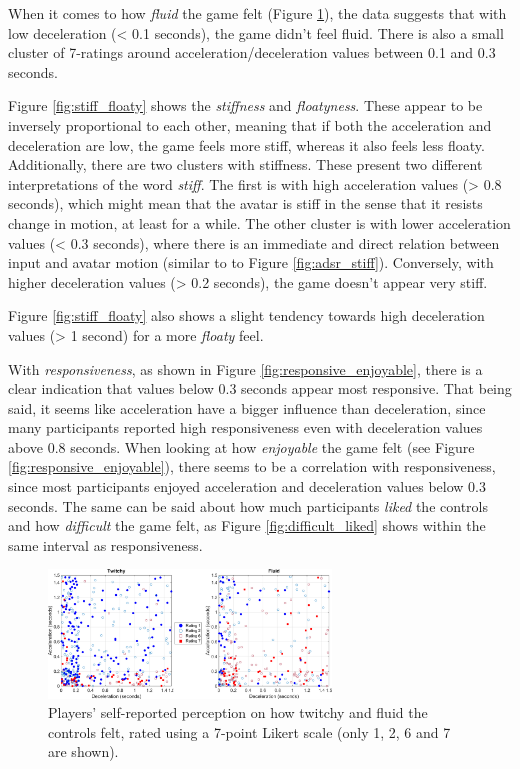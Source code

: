 When it comes to how \textit{fluid} the game felt (Figure \ref{fig:twitchyFluid}), the data suggests that with low deceleration (< 0.1 seconds), the game didn't feel fluid. There is also a small cluster of 7-ratings around acceleration/deceleration values between 0.1 and 0.3 seconds.

Figure \ref{fig:stiff_floaty} shows the \textit{stiffness} and \textit{floatyness}. These appear to be inversely proportional to each other, meaning that if both the acceleration and deceleration are low, the game feels more stiff, whereas it also feels less floaty. Additionally, there are two clusters with stiffness. These present two different interpretations of the word \textit{stiff}. The first is with high acceleration values (> 0.8 seconds), which might mean that the avatar is stiff in the sense that it resists change in motion, at least for a while. The other cluster is with lower acceleration values (< 0.3 seconds), where there is an immediate and direct relation between input and avatar motion (similar to to Figure \ref{fig:adsr_stiff}). Conversely, with higher deceleration values (> 0.2 seconds), the game doesn't appear very stiff.

Figure \ref{fig:stiff_floaty} also shows a slight tendency towards high deceleration values (> 1 second) for a more \textit{floaty} feel.

With \textit{responsiveness}, as shown in Figure \ref{fig:responsive_enjoyable}, there is a clear indication that values below 0.3 seconds appear most responsive. That being said, it seems like acceleration have a bigger influence than deceleration, since many participants reported high responsiveness even with deceleration values above 0.8 seconds. When looking at how \textit{enjoyable} the game felt (see Figure \ref{fig:responsive_enjoyable}), there seems to be a correlation with responsiveness, since most participants enjoyed acceleration and deceleration values below 0.3 seconds. The same can be said about how much participants \textit{liked} the controls and how \textit{difficult} the game felt, as Figure \ref{fig:difficult_liked} shows within the same interval as responsiveness.

\begin{figure}[htbp]
\centering
\includegraphics[width=0.67\textwidth]{Pics/Classes/twitchy_fluid}
\caption{Players' self-reported perception on how twitchy and fluid the controls felt, rated using a 7-point Likert scale (only 1, 2, 6 and 7 are shown).}
\label{fig:twitchyFluid}
\end{figure}

